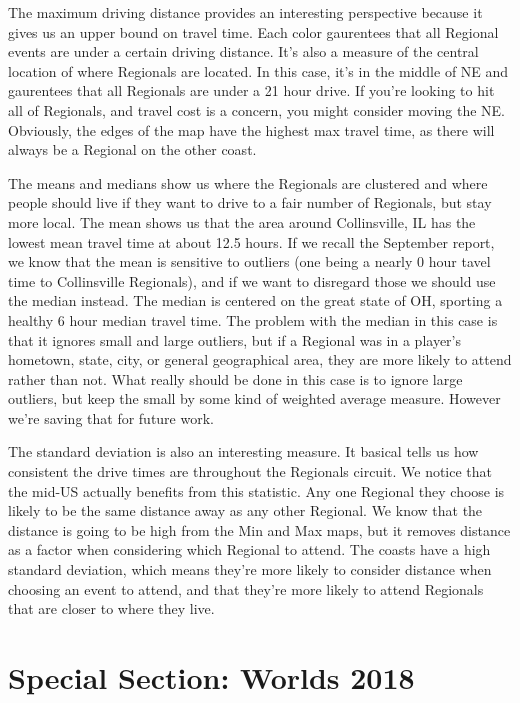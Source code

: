 \documentclass[11pt,twocolumn]{article}
\begin{document}
The maximum driving distance provides an interesting perspective because it gives us an upper bound on travel time. Each color gaurentees that all Regional events are under a certain driving distance. It's also a measure of the central location of where Regionals are located. In this case, it's in the middle of NE and gaurentees that all Regionals are under a 21 hour drive. If you're looking to hit all of Regionals, and travel cost is a concern, you might consider moving the NE. Obviously, the edges of the map have the highest max travel time, as there will always be a Regional on the other coast. 

The means and medians show us where the Regionals are clustered and where people should live if they want to drive to a fair number of Regionals, but stay more local. The mean shows us that the area around Collinsville, IL has the lowest mean travel time at about 12.5 hours. If we recall the September report, we know that the mean is sensitive to outliers (one being a nearly 0 hour tavel time to Collinsville Regionals), and if we want to disregard those we should use the median instead. The median is centered on the great state of OH, sporting a healthy 6 hour median travel time. The problem with the median in this case is that it ignores small and large outliers, but if a Regional was in a player's hometown, state, city, or general geographical area, they are more likely to attend rather than not. What really should be done in this case is to ignore large outliers, but keep the small by some kind of weighted average measure. However we're saving that for future work.

The standard deviation is also an interesting measure. It basical tells us how consistent the drive times are throughout the Regionals circuit. We notice that the mid-US actually benefits from this statistic. Any one Regional they choose is likely to be the same distance away as any other Regional. We know that the distance is going to be high from the Min and Max maps, but it removes distance as a factor when considering which Regional to attend. The coasts have a high standard deviation, which means they're more likely to consider distance when choosing an event to attend, and that they're more likely to attend Regionals that are closer to where they live. 

\section*{Special Section: Worlds 2018}
\end{document}
